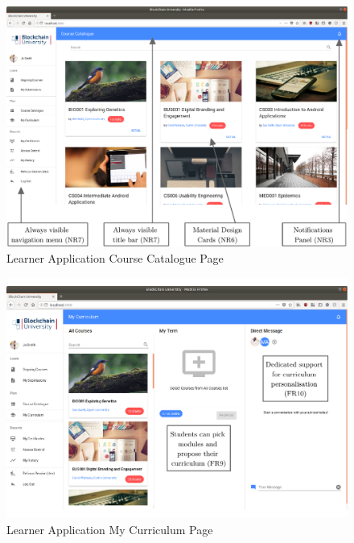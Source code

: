 \begin{figure}[!ht]
	\centering
	\includegraphics[width=1.0\textwidth]{Learner_allcourses}
	\caption[Learner Application Course Catalogue Page]
	{Learner Application Course Catalogue Page}
	\label{fig:Learner_allcourses}
\end{figure}

\begin{figure}[!ht]
	\centering
	\includegraphics[width=1.0\textwidth]{Learner_customiser}
	\caption[Learner Application My Curriculum Page]
	{Learner Application My Curriculum Page}
	\label{fig:Learner_customiser}
\end{figure}


